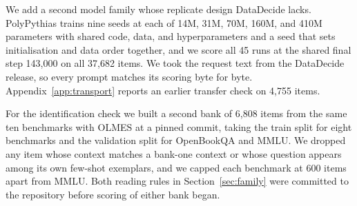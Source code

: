 We add a second model family whose replicate design DataDecide lacks. PolyPythias \citep{vanderwal2025} trains nine seeds at each of 14M, 31M, 70M, 160M, and 410M parameters with shared code, data, and hyperparameters and a seed that sets initialisation and data order together, and we score all 45 runs at the shared final step 143,000 on all 37,682 items. We took the request text from the DataDecide release, so every prompt matches its scoring byte for byte. Appendix~\ref{app:transport} reports an earlier transfer check on 4,755 items.

For the identification check we built a second bank of 6,808 items from the same ten benchmarks with OLMES at a pinned commit, taking the train split for eight benchmarks and the validation split for OpenBookQA and MMLU. We dropped any item whose context matches a bank-one context or whose question appears among its own few-shot exemplars, and we capped each benchmark at 600 items apart from MMLU. Both reading rules in Section~\ref{sec:family} were committed to the repository before scoring of either bank began.

